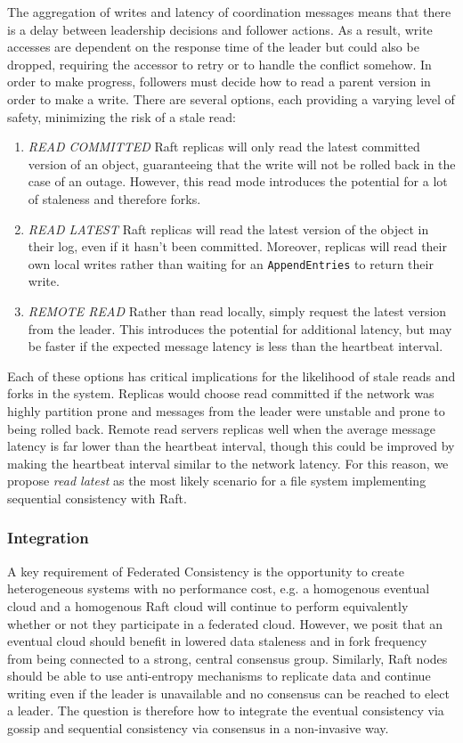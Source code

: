 \documentclass{article}
\begin{document}
The aggregation of writes and latency of coordination messages means that there is a delay between leadership decisions and follower actions. As a result, write accesses are dependent on the response time of the leader but could also be dropped, requiring the accessor to retry or to handle the conflict somehow. In order to make progress, followers must decide how to read a parent version in order to make a write. There are several options, each providing a varying level of safety, minimizing the risk of a stale read:

\begin{enumerate}
    \item \textit{READ COMMITTED} Raft replicas will only read the latest committed version of an object, guaranteeing that the write will not be rolled back in the case of an outage. However, this read mode introduces the potential for a lot of staleness and therefore forks.
    \item \textit{READ LATEST} Raft replicas will read the latest version of the object in their log, even if it hasn't been committed. Moreover, replicas will read their own local writes rather than waiting for an \texttt{AppendEntries} to return their write.
    \item \textit{REMOTE READ} Rather than read locally, simply request the latest version from the leader. This introduces the potential for additional latency, but may be faster if the expected message latency is less than the heartbeat interval.
\end{enumerate}

Each of these options has critical implications for the likelihood of stale reads and forks in the system. Replicas would choose read committed if the network was highly partition prone and messages from the leader were unstable and prone to being rolled back. Remote read servers replicas well when the average message latency is far lower than the heartbeat interval, though this could be improved by making the heartbeat interval similar to the network latency. For this reason, we propose \textit{read latest} as the most likely scenario for a file system implementing sequential consistency with Raft.

\subsubsection{Integration}
\label{sec:integration}

A key requirement of Federated Consistency is the opportunity to create heterogeneous systems with no performance cost, e.g. a homogenous eventual cloud and a homogenous Raft cloud will continue to perform equivalently whether or not they participate in a federated cloud. However, we posit that an eventual cloud should benefit in lowered data staleness and in fork frequency from being connected to a strong, central consensus group. Similarly, Raft nodes should be able to use anti-entropy mechanisms to replicate data and continue writing even if the leader is unavailable and no consensus can be reached to elect a leader. The question is therefore how to integrate the eventual consistency via gossip and sequential consistency via consensus in a non-invasive way.
\end{document}
